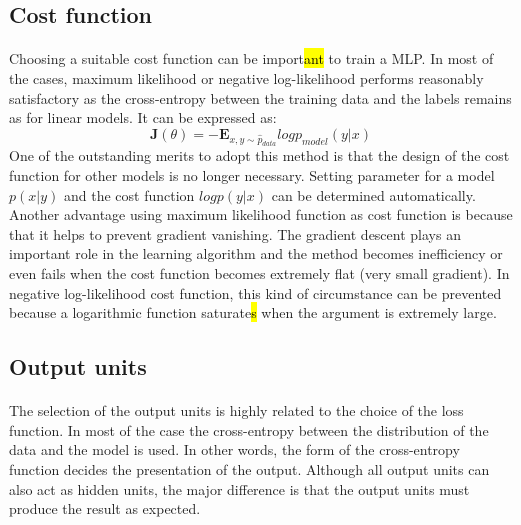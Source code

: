 \subsection{Cost function}
\paragraph{}
Choosing a suitable cost function can be import\hl{ant} to train a MLP.
In most of the cases, maximum likelihood or negative log-likelihood performs reasonably satisfactory as the cross-entropy between the training data and the labels remains as for linear models.
It can be expressed as:
\begin{equation}
    \mathbf{J}(\theta) = -\mathbf{E}_{x,y\sim \hat{p}_{data}}  log   p_{model} (y|x)
    \label{lr_eq:ml_MLE}
\end{equation}
%
One of the outstanding merits to adopt this method is that the design of the cost function for other models is no longer necessary.
Setting parameter for a model $p(x|y)$ and the cost function $log p(y|x)$ can be determined automatically.
Another advantage using maximum likelihood function as cost function is because that it helps to prevent gradient vanishing.
The gradient descent plays an important role in the learning algorithm and the method becomes inefficiency or even fails when the cost function becomes extremely flat (very small gradient).
In negative log-likelihood cost function, this kind of circumstance can be prevented because a logarithmic function saturate\hl{s} when the argument is extremely large.

\subsection{Output units}
\paragraph{}
The selection of the output units is highly related to the choice of the loss function.
In most of the case the cross-entropy between the distribution of the data and the model is used.
In other words, the form of the cross-entropy function decides the presentation of the output.
Although all output units can also act as hidden units, the major difference is that the output units must produce the result as expected.
